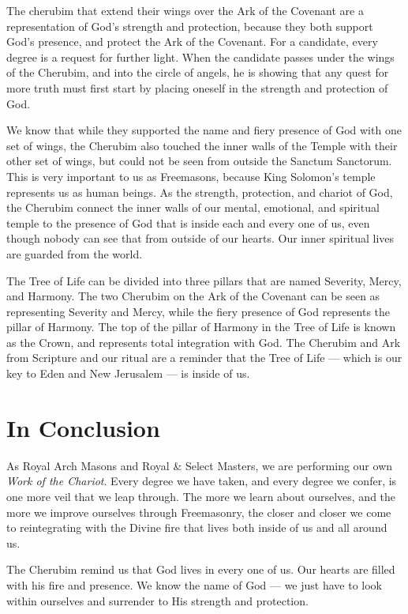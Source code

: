 \documentclass[letterpaper,11pt]{article}
\begin{document}
	The cherubim that extend their wings over the Ark of the Covenant are a representation of God's strength and protection, because they both support God's presence, and protect the Ark of the Covenant. For a candidate, every degree is a request for further light. When the candidate passes under the wings of the Cherubim, and into the circle of angels, he is showing that any quest for more truth must first start by placing oneself in the strength and protection of God.
	
	We know that while they supported the name and fiery presence of God with one set of wings, the Cherubim also touched the inner walls of the Temple with their other set of wings, but could not be seen from outside the Sanctum Sanctorum. This is very important to us as Freemasons, because King Solomon's temple represents us as human beings. As the strength, protection, and chariot of God, the Cherubim connect the inner walls of our mental, emotional, and spiritual temple to the presence of God that is inside each and every one of us, even though nobody can see that from outside of our hearts. Our inner spiritual lives are guarded from the world.
	
	The Tree of Life can be divided into three pillars that are named Severity, Mercy, and Harmony. The two Cherubim on the Ark of the Covenant can be seen as representing Severity and Mercy, while the fiery presence of God represents the pillar of Harmony. The top of the pillar of Harmony in the Tree of Life is known as the Crown, and represents total integration with God. The Cherubim and Ark from Scripture and our ritual are a reminder that the Tree of Life --- which is our key to Eden and New Jerusalem --- is inside of us.
	
	\section*{In Conclusion}
	
	As Royal Arch Masons and Royal \& Select Masters, we are performing our own \textit{Work of the Chariot}. Every degree we have taken, and every degree we confer, is one more veil that we leap through. The more we learn about ourselves, and the more we improve ourselves through Freemasonry, the closer and closer we come to reintegrating with the Divine fire that lives both inside of us and all around us.
	
	The Cherubim remind us that God lives in every one of us. Our hearts are filled with his fire and presence. We know the name of God --- we just have to look within ourselves and surrender to His strength and protection.
	
\end{document}
